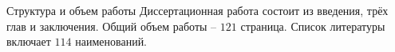 \documentclass{.local/lib/classes/ndvr-super-article-standalone}
\begin{document}
    \begin{description-item}{Структура и объем работы}
        Диссертационная работа состоит из введения, 
        трёх глав и заключения. 
        Общий объем работы – $121$ страница. 
        Список литературы включает $114$ наименований.
    \end{description-item}
\end{document}
